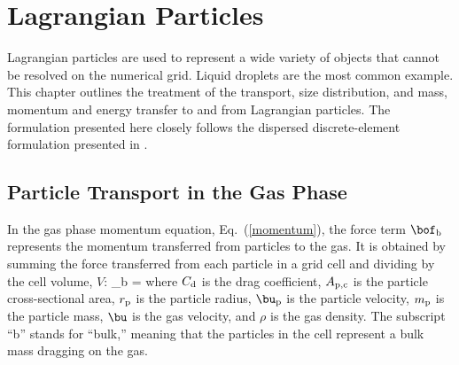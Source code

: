 

\chapter{Lagrangian Particles}
\label{chapter:lagrangian_particles}

Lagrangian particles are used to represent a wide variety of objects that cannot be resolved on
the numerical grid. Liquid droplets are the most common example. This chapter outlines the treatment of the transport, size
distribution, and mass, momentum and energy transfer to and from Lagrangian particles.  The formulation presented here closely follows the dispersed discrete-element formulation presented in \cite{Crowe:1}.

\section{Particle Transport in the Gas Phase}

In the gas phase momentum equation, Eq.~(\ref{momentum}), the force term $\bof_{\rm b}$ represents the momentum transferred from particles to the gas. It is obtained by summing the force transferred from each particle in a grid cell and dividing by the cell volume, $V$:
\be
    {\bof_{\rm b}} =  \sum  {} \label{part_force}
\ee
where $C_{\rm d}$ is the drag coefficient, $A_{\rm p,c}$ is the particle cross-sectional area, $r_{\rm p}$ is the particle radius, $\bu_{\rm p}$ is the particle velocity, $m_{\rm p}$ is the particle mass, $\bu$ is the gas velocity, and $\rho$ is the gas density. The subscript ``b'' stands for ``bulk,'' meaning that the particles in the cell represent a bulk mass dragging on the gas.

